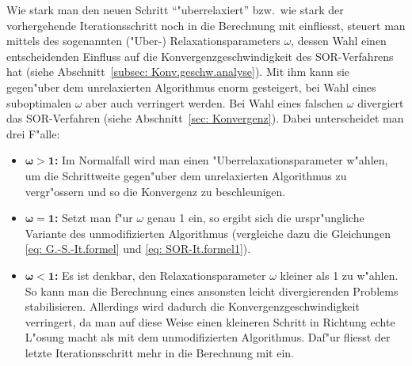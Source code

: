 \begin{refsection}
Wie stark man den neuen Schritt ``"uberrelaxiert'' bzw.~wie stark der
vorhergehende Iterationsschritt noch in die Berechnung mit einfliesst,
steuert man mittels des sogenannten ("Uber-) Relaxationsparameters
$\omega$, dessen Wahl einen entscheidenden Einfluss auf die
Konvergenzgeschwindigkeit
des SOR-Verfahrens hat (siehe Abschnitt~\ref{subsec: Konv.geschw.analyse}).
Mit ihm kann sie gegen"uber dem unrelaxierten Algorithmus enorm gesteigert,
bei Wahl eines suboptimalen $\omega$ aber auch verringert werden. Bei Wahl
eines falschen $\omega$ divergiert das SOR-Verfahren (siehe
Abschnitt~\ref{sec: Konvergenz}).
Dabei unterscheidet man drei F"alle:
\begin{itemize}
\item $\boldsymbol{\omega > 1}$\textbf{:} Im Normalfall wird man einen
"Uberrelaxationsparameter w"ahlen, um die Schrittweite gegen"uber dem
unrelaxierten Algorithmus zu vergr"ossern und so die Konvergenz zu
beschleunigen.
\item $\boldsymbol{\omega = 1}$\textbf{:} Setzt man f"ur $\omega$ genau 1 ein,
so ergibt sich die urspr"ungliche Variante des unmodifizierten Algorithmus
(vergleiche dazu die Gleichungen \ref{eq: G.-S.-It.formel} und \ref{eq:
SOR-It.formel1}).
\item $\boldsymbol{\omega < 1}$\textbf{:} Es ist denkbar, den
Relaxationsparameter $\omega$
kleiner als 1 zu w"ahlen. So kann man die Berechnung eines ansonsten leicht
divergierenden
Problems stabilisieren. Allerdings wird dadurch die
Konvergenzgeschwindigkeit verringert,
da man auf diese Weise einen kleineren Schritt in Richtung echte L"osung
macht als mit dem
unmodifizierten Algorithmus.
Daf"ur fliesst der letzte Iterationsschritt mehr in die Berechnung mit ein.
\end{itemize}


\end{refsection}
